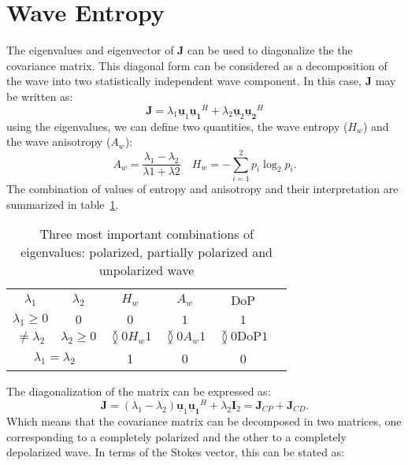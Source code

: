 \documentclass[11pt]{article}
\begin{document}
\section{Wave Entropy}
The eigenvalues and eigenvector of $\mathbf{J}$ can be used to diagonalize the the covariance matrix. This diagonal form can
be considered as a decomposition of the wave into two statistically independent wave component. In this case, $\mathbf{J}$ may be written as:
\begin{equation}
	\mathbf{J} = \lambda_{1}\mathbf{\underline{u}}_{1}\mathbf{\underline{u}_{1}}^{H} + 
				\lambda_{2}\mathbf{\underline{u}}_{2}\mathbf{\underline{u}_{2}}^{H}
\end{equation}
using the eigenvalues, we can define two quantities, the wave entropy ($H_{w}$) and the wave anisotropy  ($A_{w}$):
\begin{equation}
	A_{w} = \frac{\lambda_{1} - \lambda_{2}}{\lambda{1} + \lambda{2}}\quad H_{w} = -\sum_{i=1}^{2}p_{i}\log_{2}{p_{i}}.
\end{equation}
The combination of values of entropy and anisotropy and their interpretation are summarized in table~\ref{tb:entropyW}.
\begin{table}[b]
	\centering
	\begin{tabular}{cccccc}
		\hline
		$\lambda_{1}$ & $\lambda_{2}$ & $H_{w}$ & $A_{w}$ & DoP\\
		$\lambda_{1} \geq 0$ & $0$ & $0$ & $1$ & $1$\\
		$\neq \lambda_{2}$ & $\lambda_{2}\geq 0$ & $\between{0}{H_{w}}{1}$ & $\between{0}{A_{w}}{1}$ & $\between{0}{\mathrm{DoP}}{1}$	\\
		\multicolumn{2}{c}{$\lambda_{1} = \lambda_{2}$} & 1 & 0 & 0\\
		\hline
	\end{tabular}
	\caption{Three most important combinations of eigenvalues: polarized, partially polarized and unpolarized wave}
	\label{tb:entropyW}
\end{table}
The diagonalization of the matrix can be expressed as:
\begin{equation}
	\mathbf{J} = \left(\lambda_{1} - \lambda_{2}\right)\mathbf{\underline{u}}_{1}\mathbf{\underline{u}_{1}}^{H} + 
				\lambda_{2}\mathbf{I}_{2} = \mathbf{J}_{CP} + \mathbf{J}_{CD}.
\end{equation}
Which means that the covariance matrix can be decomposed in two matrices, one corresponding to a completely polarized and the other to a completely depolarized wave. In terms of the Stokes vector, this can be stated as:
\end{document}
